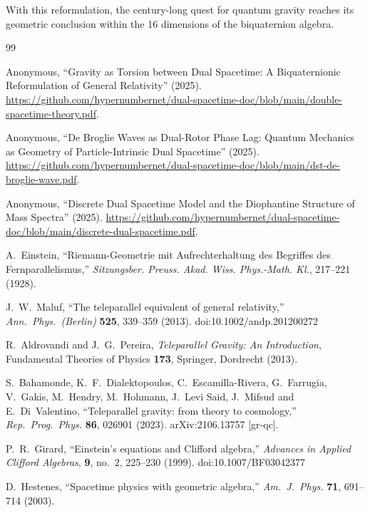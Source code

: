 \documentclass[dvipdfmx,11pt,a4paper]{article}
\begin{document}
With this reformulation, the century-long quest for quantum gravity reaches its geometric conclusion within the 16 dimensions of the biquaternion algebra.


\begin{thebibliography}{99}
\raggedright

Anonymous,
``Gravity as Torsion between Dual Spacetime: A Biquaternionic Reformulation of General Relativity'' (2025).
\url{https://github.com/hypernumbernet/dual-spacetime-doc/blob/main/double-spacetime-theory.pdf}.

Anonymous,
``De Broglie Waves as Dual-Rotor Phase Lag: Quantum Mechanics as Geometry of Particle-Intrinsic Dual Spacetime'' (2025).
\url{https://github.com/hypernumbernet/dual-spacetime-doc/blob/main/dst-de-broglie-wave.pdf}.

Anonymous,
``Discrete Dual Spacetime Model and the Diophantine Structure of Mass Spectra'' (2025).
\url{https://github.com/hypernumbernet/dual-spacetime-doc/blob/main/discrete-dual-spacetime.pdf}.

A.~Einstein,
``Riemann-Geometrie mit Aufrechterhaltung des Begriffes des Fernparallelismus,''
\textit{Sitzungsber. Preuss. Akad. Wiss. Phys.-Math. Kl.},
217--221 (1928).

J.~W.~Maluf,
``The teleparallel equivalent of general relativity,''
\textit{Ann.\ Phys.\ (Berlin)} \textbf{525}, 339--359 (2013).
doi:10.1002/andp.201200272

R.~Aldrovandi and J.~G.~Pereira,
\textit{Teleparallel Gravity: An Introduction},
Fundamental Theories of Physics \textbf{173},
Springer, Dordrecht (2013).

S.~Bahamonde, K.~F.~Dialektopoulos, C.~Escamilla-Rivera, G.~Farrugia, V.~Gakis, M.~Hendry, M.~Hohmann, J.~Levi Said, J.~Mifsud and E.~Di~Valentino,
``Teleparallel gravity: from theory to cosmology,''
\textit{Rep.\ Prog.\ Phys.} \textbf{86}, 026901 (2023).
arXiv:2106.13757 [gr-qc].

P.~R.~Girard,
``Einstein's equations and Clifford algebra,''
\textit{Advances in Applied Clifford Algebras},
\textbf{9}, no.~2, 225--230 (1999).
doi:10.1007/BF03042377

D.~Hestenes,
``Spacetime physics with geometric algebra,''
\textit{Am.\ J.\ Phys.} \textbf{71}, 691--714 (2003).


\end{thebibliography}
\end{document}
